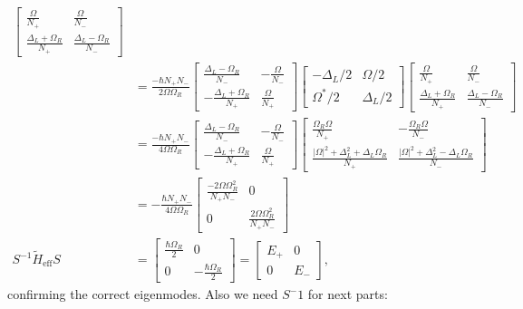 \documentclass[letterpaper,11pt,twoside]{article}
\begin{document}
\begin{enumerate}[itemsep=0pt,topsep=0pt,parsep=0pt,label=\alph*)]
\begin{align*}
\begin{bmatrix}
      \frac{\Omega}{N_+}&\frac{\Omega}{N_-}\\
      \frac{\Delta_L+\Omega_R}{N_+}&\frac{\Delta_L-\Omega_R}{N_-}
    \end{bmatrix}\\
    &=\frac{-\hbar N_+N_-}{2\Omega\Omega_R}\begin{bmatrix}
      \frac{\Delta_L-\Omega_R}{N_-}&-\frac{\Omega}{N_-}\\-\frac{\Delta_L+\Omega_R}{N_+}&\frac{\Omega}{N_+}
    \end{bmatrix}\begin{bmatrix}
      -\Delta_L/2&\Omega/2\\\Omega^*/2&\Delta_L/2
    \end{bmatrix}\begin{bmatrix}
      \frac{\Omega}{N_+}&\frac{\Omega}{N_-}\\
      \frac{\Delta_L+\Omega_R}{N_+}&\frac{\Delta_L-\Omega_R}{N_-}
    \end{bmatrix}\\
    &=\frac{-\hbar N_+N_-}{4\Omega\Omega_R}\begin{bmatrix}
      \frac{\Delta_L-\Omega_R}{N_-}&-\frac{\Omega}{N_-}\\-\frac{\Delta_L+\Omega_R}{N_+}&\frac{\Omega}{N_+}
    \end{bmatrix}\begin{bmatrix}
      \frac{\Omega_R\Omega}{N_+}&-\frac{\Omega_R\Omega}{N_-}\\\frac{|\Omega|^2+\Delta_L^2+\Delta_L\Omega_R}{N_+}&\frac{|\Omega|^2+\Delta_L^2-\Delta_L\Omega_R}{N_-}
    \end{bmatrix}\\
    &=-\frac{\hbar N_+N_-}{4\Omega\Omega_R}\begin{bmatrix}
      \frac{-2\Omega\Omega^2_R}{N_+N_-}&0\\0&\frac{2\Omega\Omega^2_R}{N_+N_-}
    \end{bmatrix}\\
    S^{-1}\tilde{H}_{\mathrm{eff}}S&=\begin{bmatrix}
      \frac{\hbar\Omega_R}{2}&0\\0&-\frac{\hbar\Omega_R}{2}
    \end{bmatrix}=\begin{bmatrix}
      E_+&0\\0&E_-
    \end{bmatrix},
  \end{align*}
  confirming the correct eigenmodes. Also we need $S^-1$ for next parts:
  \begin{align*}

\end{align*}
\end{enumerate}
\end{document}
